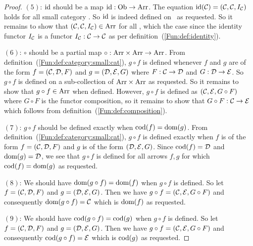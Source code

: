 \begin{proof}
    $(5)$: $\mbox{\rm id}$ should be a map $\mbox{\rm id}:\mbox{\rm Ob}\to\mbox{\rm Arr}$. The equation $\mbox{\rm id}(\mbox{$\cal C$})
    =(\mbox{$\cal C$},\mbox{$\cal C$},I_{\cal C})$ holds for all small category \Cat. So $\mbox{\rm id}$
    is indeed defined on \ob\ as requested. So it remains to show that
    $(\mbox{$\cal C$},\mbox{$\cal C$},I_{\cal C})\in\mbox{\rm Arr}$ for all \Cat, which the case since
    the identity functor $I_{\cal C}$ is a functor $I_{\cal C}:\mbox{$\cal C$}\to\mbox{$\cal C$}$ as 
    per definition~(\ref{Fun:def:identity}).

    $(6)$: $\circ$ should be a partial map $\circ:\mbox{\rm Arr}\times\mbox{\rm Arr}\to\mbox{\rm Arr}$.
    From definition~(\ref{Fun:def:category:small:cat}), $g\circ f$ is defined
    whenever $f$ and $g$ are of the form $f=(\mbox{$\cal C$},\mbox{$\cal D$},F)$ and $g=(\mbox{$\cal D$},\mbox{$\cal E$},G)$
    where $F:\mbox{$\cal C$}\to\mbox{$\cal D$}$ and $G:\mbox{$\cal D$}\to\mbox{$\cal E$}$. So $g\circ f$ is defined on
    a sub-collection of $\mbox{\rm Arr}\times\mbox{\rm Arr}$ as requested. So it remains to 
    show that $g\circ f\in\mbox{\rm Arr}$ when defined. However, $g\circ f$ is defined
    as $(\mbox{$\cal C$},\mbox{$\cal E$},G \circ F)$ where $G\circ F$ is the functor composition,
    so it remains to show that $G\circ F:\mbox{$\cal C$}\to\mbox{$\cal E$}$ which follows from
    definition~(\ref{Fun:def:composition}).

    $(7)$: $g\circ f$ should be defined exactly when $\mbox{\rm cod}(f)=\mbox{\rm dom}(g)$. From
    definition~(\ref{Fun:def:category:small:cat}), $g\circ f$ is defined 
    exactly when $f$ is of the form $f=(\mbox{$\cal C$},\mbox{$\cal D$},F)$ and $g$ is of the form
    $(\mbox{$\cal D$},\mbox{$\cal E$},G)$. Since $\mbox{\rm cod}(f)=\mbox{$\cal D$}$ and $\mbox{\rm dom}(g)=\mbox{$\cal D$}$, we see that
    $g\circ f$ is defined for all arrows $f,g$ for which $\mbox{\rm cod}(f)=\mbox{\rm dom}(g)$ 
    as requested.

    $(8)$: We should have $\mbox{\rm dom}(g\circ f) = \mbox{\rm dom}(f)$ when $g\circ f$ is defined.
    So let $f=(\mbox{$\cal C$},\mbox{$\cal D$},F)$ and $g=(\mbox{$\cal D$},\mbox{$\cal E$},G)$. Then we have 
    $g\circ f=(\mbox{$\cal C$},\mbox{$\cal E$},G\circ F)$ and consequently $\mbox{\rm dom}(g\circ f)=\mbox{$\cal C$}$ which
    is $\mbox{\rm dom}(f)$ as requested.

    $(9)$: We should have $\mbox{\rm cod}(g\circ f) = \mbox{\rm cod}(g)$ when $g\circ f$ is defined.
    So let $f=(\mbox{$\cal C$},\mbox{$\cal D$},F)$ and $g=(\mbox{$\cal D$},\mbox{$\cal E$},G)$. Then we have 
    $g\circ f=(\mbox{$\cal C$},\mbox{$\cal E$},G\circ F)$ and consequently $\mbox{\rm cod}(g\circ f)=\mbox{$\cal E$}$ which
    is $\mbox{\rm cod}(g)$ as requested.


\end{proof}
